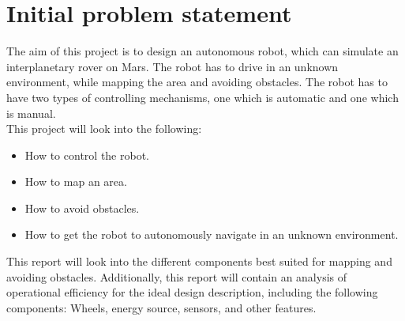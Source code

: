 \chapter{Initial problem statement}

The aim of this project is to design an autonomous robot, which can simulate an interplanetary rover on Mars. The robot has to drive in an unknown environment, while mapping the area and avoiding obstacles. The robot has to have two types of controlling mechanisms, one which is automatic and one which is manual.\\
\newline
This project will look into the following:

\begin{itemize}
\item How to control the robot.
\item How to map an area.
\item How to avoid obstacles.
\item How to get the robot to autonomously navigate in an unknown environment.
\end{itemize}

This report will look into the different components best suited for mapping and avoiding obstacles. Additionally, this report will contain an analysis of operational efficiency for the ideal design description, including the following components: Wheels, energy source, sensors, and other features. 









